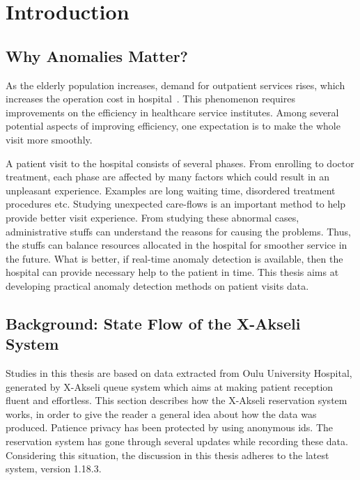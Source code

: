 \chapter{Introduction}
\label{chapter:intro}
\section{Why Anomalies Matter?}
As the elderly population increases, demand for outpatient services rises, which increases the operation cost in hospital~\cite{gupta2008appointment}\cite{hulshof2012taxonomic}. This phenomenon requires improvements on the efficiency in healthcare service institutes. Among several potential aspects of improving efficiency, one expectation is to make the whole visit more smoothly. 

A patient visit to the hospital consists of several phases. From enrolling to doctor treatment, each phase are affected by many factors which could result in an unpleasant experience. Examples are long waiting time, disordered treatment procedures etc. Studying unexpected care-flows is an important method to help provide better visit experience. From studying these abnormal cases, administrative stuffs can understand the reasons for causing the problems. Thus, the stuffs can balance resources allocated in the hospital for smoother service in the future. What is better, if real-time anomaly detection is available, then the hospital can provide necessary help to the patient in time. This thesis aims at developing practical anomaly detection methods on patient visits data.

\section{Background: State Flow of the X-Akseli System}
Studies in this thesis are based on data extracted from Oulu University Hospital, generated by X-Akseli queue system which aims at making patient reception fluent and effortless. This section describes how the X-Akseli reservation system works, in order to give the reader a general idea about how the data was produced. Patience privacy has been protected by using anonymous ids. The reservation system has gone through several updates while recording these data. Considering this situation, the discussion in this thesis adheres to the latest system, version 1.18.3.


